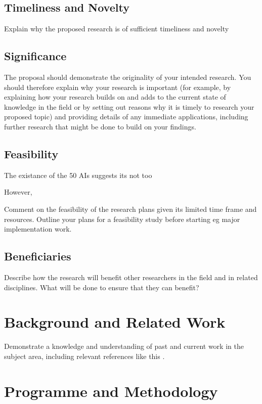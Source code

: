 \documentclass[a4paper,11pt]{article}
\begin{document}
\subsection{Timeliness and Novelty}



Explain why the proposed research is of sufficient timeliness and novelty

\subsection{Significance}

The proposal should demonstrate the originality of your intended research. You should therefore explain why your research is important (for example, by explaining how your research builds on and adds to the current state of knowledge in the field or by setting out reasons why it is timely to research your proposed topic) and providing details of any immediate applications, including further research that might be done to build on your findings.

\subsection{Feasibility}

The existance of the 50 AIs suggests its not too

However, 

Comment on the feasibility of the research plans given its limited time frame and resources. Outline your plans for a feasibility study before starting eg major implementation work.

\subsection{Beneficiaries}

Describe how the research will benefit other researchers in the field and in related disciplines. What will be done to ensure that they can benefit? 


\section{Background and Related Work}

Demonstrate a knowledge and understanding of past and current work in the subject area, including relevant references like this \cite{template}.


\section{Programme and Methodology}
\end{document}
